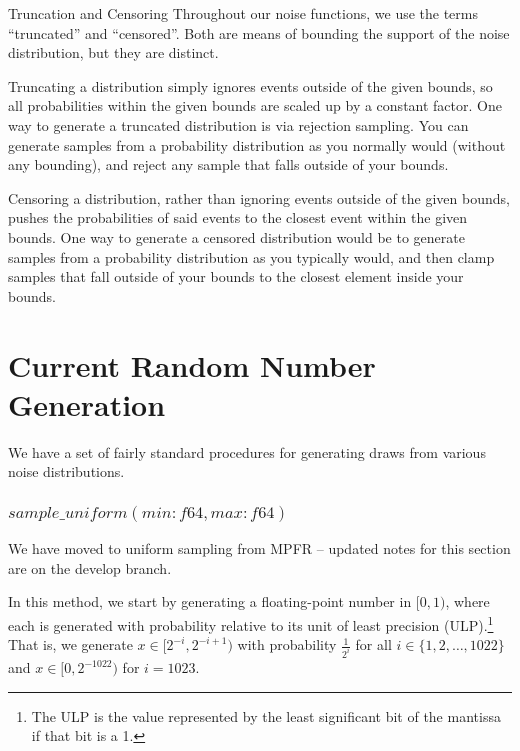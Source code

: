 \documentclass[11pt]{scrartcl} %
\begin{document}
\begin{definition}
	\label{def:truncation_censoring}
	Truncation and Censoring \newline
	Throughout our noise functions, we use the terms ``truncated'' and ``censored''.
	Both are means of bounding the support of the noise distribution, but they are distinct. \newline

	Truncating a distribution simply ignores events outside of the given bounds, so
	all probabilities within the given bounds are scaled up by a constant factor.
	One way to generate a truncated distribution is via rejection sampling.
	You can generate samples from a probability distribution as you normally would (without any bounding),
	and reject any sample that falls outside of your bounds. \newline

	Censoring a distribution, rather than ignoring events outside of the given bounds, pushes the
	probabilities of said events to the closest event within the given bounds. One way to generate
	a censored distribution would be to generate samples from a probability distribution as you
	typically would, and then clamp samples that fall outside of your bounds to the closest element
	inside your bounds.
\end{definition}

\section{Current Random Number Generation}
We have a set of fairly standard procedures for generating draws from various noise distributions.


\subsubsection{$sample\_uniform(min: f64, max: f64)$}
\begin{tcolorbox}[colback = {green}, title = {Update}, colbacktitle = black]
	We have moved to uniform sampling from MPFR -- updated notes for this section are on the develop branch.
\end{tcolorbox}
In this method, we start by generating a floating-point number in $[0,1)$,
where each is generated with probability relative to its unit of least precision (ULP).\footnote{The ULP is the value
represented by the least significant bit of the mantissa if that bit is a 1.}
That is, we generate $x \in [2^{-i}, 2^{-i+1})$ with probability $\frac{1}{2^i}$
for all $i \in \{1,2,\hdots,1022\}$ and $x \in [0, 2^{-1022})$ for $i = 1023$.
\end{document}
